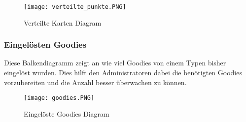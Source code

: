 				\begin{figure}[H]
					\centering
					\texttt{[image: verteilte\_punkte.PNG]}
					\caption{Verteilte Karten Diagram}
				\end{figure}

			\subsubsection{Eingelösten Goodies}
				Diese Balkendiagramm zeigt an wie viel Goodies von einem Typen bisher eingelöst wurden. Dies hilft den Administratoren dabei die benötigten Goodies vorzubereiten und die Anzahl besser überwachen zu können. 

				\begin{figure}[H]
					\centering
					\texttt{[image: goodies.PNG]}
					\caption{Eingelöste Goodies Diagram}
				\end{figure}
